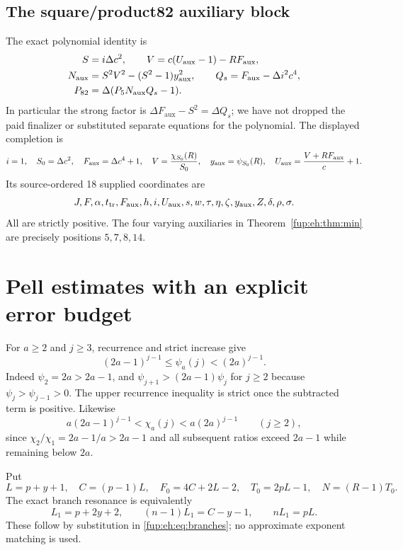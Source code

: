 \documentclass[11pt,letterpaper]{article}
\theoremstyle{definition}\newtheorem{definition}[theorem]{Definition}
\theoremstyle{remark}\newtheorem{remark}[theorem]{Remark}
\newcommand{\D}{\Delta}
\newcommand{\ch}[2]{\chi_{#1}(#2)}\newcommand{\ps}[2]{\psi_{#1}(#2)}
\newcommand{\Na}{N_{\mathrm{aux}}}\newcommand{\Nk}{N_{\mathrm{index}}}\newcommand{\Nt}{N_{\mathrm{transport}}}
\newcommand{\Fa}{F_{\mathrm{aux}}}\newcommand{\Ua}{U_{\mathrm{aux}}}\newcommand{\ttt}{t_{\mathrm{tr}}}
\begin{document}
\subsection{The square/product82 auxiliary block}
The exact polynomial identity is
\begin{align}
 S&=i\D c^2,\qquad V=c(\Ua-1)-R\Fa,\label{fup:eh:eq:82aux}\\
 \Na&=S^2V^2-(S^2-1)\yaux^2,\qquad Q_s=\Fa-\D i^2c^4,\nonumber\\
 P_{82}&=\D(P_5\Na Q_s-1).\label{fup:eh:eq:82poly}
\end{align}
In particular the strong factor is $\D\Fa-S^2=\D Q_s$;
we have not dropped the paid finalizer or substituted separate equations
for the polynomial. The displayed completion is
\begin{equation}\label{fup:eh:eq:completion}
 i=1,\quad S_0=\D c^2,\quad \Fa=\D c^4+1,\quad
 V=\frac{\ch{S_0}R}{S_0},\quad \yaux=\ps{S_0}R,\quad
 \Ua=\frac{V+R\Fa}{c}+1.
\end{equation}
Its source-ordered 18 supplied coordinates are
\begin{equation}\label{fup:eh:eq:witnesslist}
 J,F,\alpha,\ttt,\Fa,h,i,\Ua,s,w,
 \tau,\eta,\zeta,\yaux,Z,\delta,\rho,\sigma.
\end{equation}
All are strictly positive. The four varying auxiliaries in
Theorem~\ref{fup:eh:thm:min} are precisely positions $5,7,8,14$.

\section{Pell estimates with an explicit error budget}
\label{fup:eh:sec:error}
For $a\ge2$ and $j\ge3$, recurrence and strict increase give
\begin{equation}\label{fup:eh:eq:pellbounds}
 (2a-1)^{j-1}\le\ps a j<(2a)^{j-1}.
\end{equation}
Indeed $\psi_2=2a>2a-1$, and
$\psi_{j+1}>(2a-1)\psi_j$ for $j\ge2$ because
$\psi_j>\psi_{j-1}>0$. The upper recurrence inequality is strict once
the subtracted term is positive. Likewise
\begin{equation}\label{fup:eh:eq:chibounds}
 a(2a-1)^{j-1}<\ch a j<a(2a)^{j-1}\qquad(j\ge2),
\end{equation}
since $\chi_2/\chi_1=2a-1/a>2a-1$ and all subsequent ratios
exceed $2a-1$ while remaining below $2a$.

Put
\begin{equation}\label{fup:eh:eq:budgetvars}
 L=p+y+1,\quad C=(p-1)L,\quad F_0=4C+2L-2,\quad
 T_0=2pL-1,\quad N=(R-1)T_0.
\end{equation}
The exact branch resonance is equivalently
\begin{equation}\label{fup:eh:eq:resonance}
 L_1=p+2y+2,\qquad (n-1)L_1=C-y-1,\qquad nL_1=pL.
\end{equation}
These follow by substitution in \eqref{fup:eh:eq:branches}; no approximate
exponent matching is used.
\end{document}
